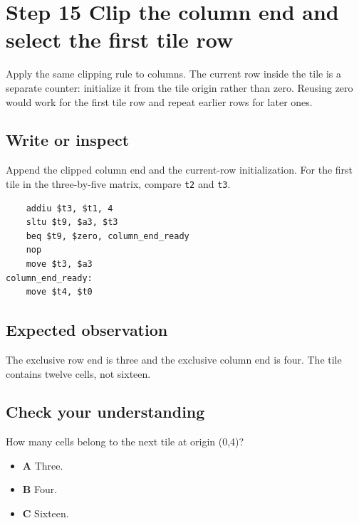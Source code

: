 \section{Step 15 Clip the column end and select the first tile row}\label{transpose-s15}

Apply the same clipping rule to columns. The current row inside the tile is a separate counter: initialize it from the tile origin rather than zero. Reusing zero would work for the first tile row and repeat earlier rows for later ones.

\subsection{Write or inspect}
Append the clipped column end and the current-row initialization. For the first tile in the three-by-five matrix, compare \texttt{t2} and \texttt{t3}.

\begin{verbatim}
    addiu $t3, $t1, 4
    sltu $t9, $a3, $t3
    beq $t9, $zero, column_end_ready
    nop
    move $t3, $a3
column_end_ready:
    move $t4, $t0
\end{verbatim}

\subsection{Expected observation}
The exclusive row end is three and the exclusive column end is four. The tile contains twelve cells, not sixteen.

\subsection{Check your understanding}
How many cells belong to the next tile at origin (0,4)?

\begin{itemize}
  \item \textbf{A} Three.
  \item \textbf{B} Four.
  \item \textbf{C} Sixteen.
\end{itemize}
